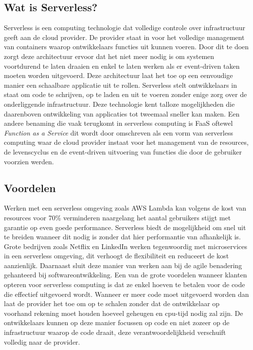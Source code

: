 \subsection{Wat is Serverless?}
Serverless is een computing technologie dat volledige controle over infrastructuur geeft aan de cloud provider. De provider staat in voor het volledige management van containers waarop ontwikkelaars functies uit kunnen voeren. Door dit te doen zorgt deze architectuur ervoor dat het niet meer nodig is om systemen voortdurend te laten draaien en enkel te laten werken als er event-driven taken moeten worden uitgevoerd. Deze architectuur laat het toe op een eenvoudige manier een schaalbare applicatie uit te rollen. Serverless stelt ontwikkelaars in staat om code te schrijven, op te laden en uit te voeren zonder enige zorg over de onderliggende infrastructuur. Deze technologie kent talloze mogelijkheden die daarenboven ontwikkeling van applicaties tot tweemaal sneller kan maken. \autocite{Stigler2017} Een andere benaming die vaak terugkomt in serverless computing is FaaS oftewel \textit{Function as a Service} dit wordt door \textcite{VanEyck2018} omschreven als een vorm van serverless computing waar de cloud provider instaat voor het management van de resources, de levenscyclus en de event-driven uitvoering van functies die door de gebruiker voorzien werden.

\subsection{Voordelen}
Werken met een serverless omgeving zoals AWS Lambda kan volgens \textcite{Perez2018} de kost van resources voor 70\% verminderen naargelang het aantal gebruikers stijgt met garantie op even goede performance. Serverless biedt de mogelijkheid om snel uit te breiden wanneer dit nodig is zonder dat hier performantie van afhankelijk is. Grote bedrijven zoals Netflix en LinkedIn werken tegenwoordig met microservices in een serverless omgeving, dit verhoogt de flexibiliteit en reduceert de kost aanzienlijk. Daarnaast sluit deze manier van werken aan bij de agile benadering gehanteerd bij softwareontwikkeling. \autocite{Villamizar2017} Een van de grote voordelen wanneer klanten opteren voor serverless computing is dat ze enkel hoeven te betalen voor de code die effectief uitgevoerd wordt. Wanneer er meer code moet uitgevoerd worden dan laat de provider het toe om op te schalen zonder dat de ontwikkelaar op voorhand rekening moet houden hoeveel geheugen en cpu-tijd nodig zal zijn. De ontwikkelaars kunnen op deze manier focussen op code en niet zozeer op de infrastructuur waarop de code draait, deze verantwoordelijkheid verschuift volledig naar de provider. \autocite{Savage2018}


